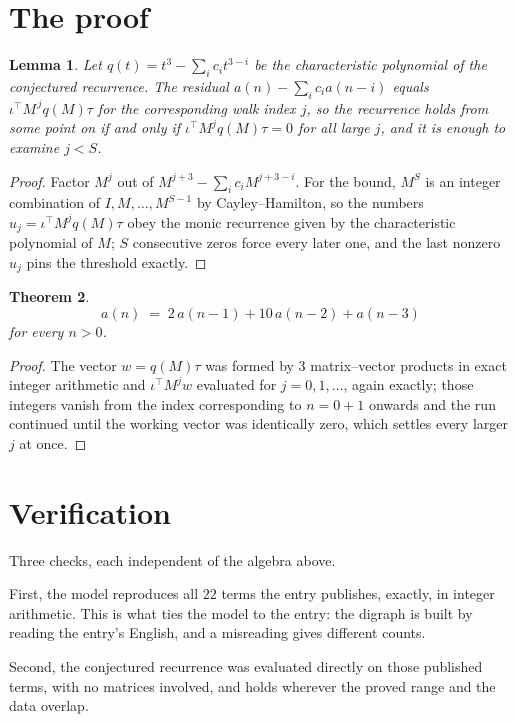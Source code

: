 \documentclass[11pt,a4paper]{article}
\theoremstyle{plain}
\newtheorem{theorem}{Theorem}
\newtheorem{lemma}[theorem]{Lemma}
\theoremstyle{definition}
\begin{document}
\section{The proof}

\begin{lemma}\label{lem:crit}
Let $q(t)=t^{3}-\sum_i c_it^{3-i}$ be the characteristic polynomial of the
conjectured recurrence. The residual $a(n)-\sum_ic_ia(n-i)$ equals
$\iota^{\!\top}M^{\,j}q(M)\tau$ for the corresponding walk index $j$, so the recurrence
holds from some point on if and only if $\iota^{\!\top}M^{j}q(M)\tau=0$ for all large $j$,
and it is enough to examine $j<S$.
\end{lemma}

\begin{proof}
Factor $M^{j}$ out of $M^{j+3}-\sum_ic_iM^{j+3-i}$. For the bound, $M^{S}$
is an integer combination of $I,M,\dots,M^{S-1}$ by Cayley--Hamilton, so the numbers
$u_j=\iota^{\!\top}M^{j}q(M)\tau$ obey the monic recurrence given by the characteristic
polynomial of $M$; $S$ consecutive zeros force every later one, and the last nonzero $u_j$
pins the threshold exactly.
\end{proof}

\begin{theorem}
\[
a(n)\;=\;2\,a(n-1) + 10\,a(n-2) + a(n-3)
\]
for every $n>0$.
\end{theorem}

\begin{proof}
The vector $w=q(M)\tau$ was formed by $3$ matrix--vector products in exact integer
arithmetic and $\iota^{\!\top}M^{j}w$ evaluated for $j=0,1,\dots$, again exactly; those
integers vanish from the index corresponding to $n=0+1$ onwards and the run continued
until the working vector was identically zero, which settles every larger $j$ at once.
\end{proof}

\section{Verification}

Three checks, each independent of the algebra above.

First, the model reproduces all $22$ terms the entry publishes, exactly, in integer
arithmetic. This is what ties the model to the entry: the digraph is built by reading the
entry's English, and a misreading gives different counts.

Second, the conjectured recurrence was evaluated directly on those published terms, with no
matrices involved, and holds wherever the proved range and the data overlap.
\end{document}
